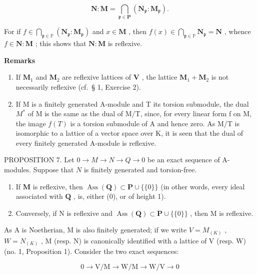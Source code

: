 \[
\mathbf {N}: \mathbf {M} = \bigcap_ {\mathfrak {p} \in \mathbf {P}} \left(\mathbf {N} _ {\mathfrak {p}}: \mathbf {M} _ {\mathfrak {p}}\right).
\]

For if \(f \in \bigcap_{\mathfrak{p} \in \mathbb{P}} (\mathbf{N}_{\mathfrak{p}}: \mathbf{M}_{\mathfrak{p}})\) and \(x \in \mathbf{M}\) , then \(f(x) \in \bigcap_{\mathfrak{p} \in \mathbb{P}} \mathbf{N}_{\mathfrak{p}} = \mathbf{N}\) , whence \(f \in \mathbf{N}: \mathbf{M}\) ; this shows that \(\mathbf{N}: \mathbf{M}\) is reflexive.

\textbf{Remarks}\par

\begin{enumerate}
\def\labelenumi{(\arabic{enumi})}
\setcounter{enumi}{1}
\item
  If \(\mathbf{M}_1\) and \(\mathbf{M}_2\) are reflexive lattices of \(\mathbf{V}\) , the lattice \(\mathbf{M}_1 + \mathbf{M}_2\) is not necessarily reflexive (cf.~§ 1, Exercise 2).
\item
  If M is a finitely generated A-module and T its torsion submodule, the dual \(M^{*}\) of M is the same as the dual of M/T, since, for every linear form f on M, the image \(f(T)\) is a torsion submodule of A and hence zero. As M/T is isomorphic to a lattice of a vector space over K, it is seen that the dual of every finitely generated A-module is reflexive.
\end{enumerate}

PROPOSITION 7. Let \(0 \to M \to N \to Q \to 0\) be an exact sequence of A-modules. Suppose that \(N\) is finitely generated and torsion-free.

\begin{enumerate}
\def\labelenumi{(\roman{enumi})}
\item
  If \(\mathbf{M}\) is reflexive, then \(\operatorname{Ass}(\mathbf{Q}) \subset \mathbf{P} \cup \{\{0\}\}\) (in other words, every ideal associated with \(\mathbf{Q}\) , is, either (0), or of height 1).
\item
  Conversely, if N is reflexive and \(\operatorname{Ass}(\mathbf{Q}) \subset \mathbf{P} \cup \{\{0\}\}\) , then M is reflexive.
\end{enumerate}

As A is Noetherian, M is also finitely generated; if we write \(V = M_{(K)}\) , \(W = N_{(K)}\) , M (resp. N) is canonically identified with a lattice of V (resp. W) (no. 1, Proposition 1). Consider the two exact sequences:

\[
0 \rightarrow \mathrm{V} / \mathrm{M} \rightarrow \mathrm{W} / \mathrm{M} \rightarrow \mathrm{W} / \mathrm{V} \rightarrow 0
\]

